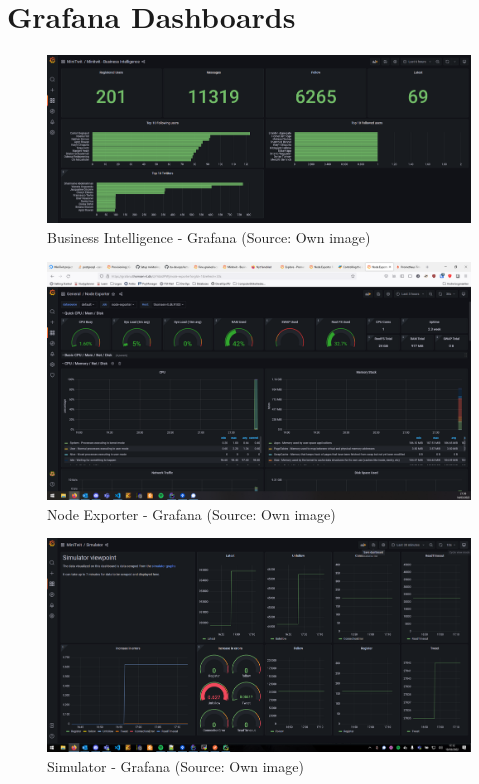\section{Grafana Dashboards}\label{app:grafana_dashboards}

\begin{figure}[H]
    \centering
    \includegraphics[width = \linewidth]{images/monitoring/business_intelligence_1.png}
    \caption{Business Intelligence - Grafana (Source: Own image)}
\end{figure}

\begin{figure}[H]
    \centering
    \includegraphics[width = \linewidth]{images/monitoring/node_exporter_1.png}
    \caption{Node Exporter - Grafana (Source: Own image)}
\end{figure}

\begin{figure}[H]
    \centering
    \includegraphics[width = \linewidth]{images/monitoring/simulator_1.png}
    \caption{Simulator - Grafana (Source: Own image)}
\end{figure}

